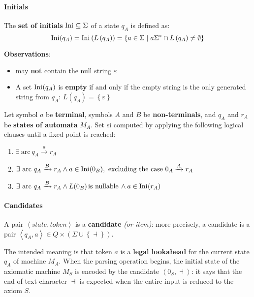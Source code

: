 \documentclass[english]{article}
\begin{document}
\paragraph{Initials}

The \textbf{set of initials} \(\text{Ini}\hspace{0.1ex} \subseteq \Sigma\) of a state \(q_A\) is defined as:
\[ \text{Ini}\hspace{0.1ex}(q_A) = \text{Ini}\hspace{0.1ex}\left( L\left( q_A \right) \right) = \left\{ a \in \Sigma \mid a \Sigma^\ast \cap L\left( q_A \right) \neq \emptyset \right\} \]

\bigskip
\textbf{Observations}:

\begin{itemize}
  \item \Ini may \textbf{not} contain the null string \(\varepsilon\)
  \item A set \(\text{Ini}\hspace{0.1ex}(q_A)\) is \textbf{empty} if and only if the empty string is the only generated string from \(q_A\): \(L\left( q_A \right) = \left\{ \varepsilon \right\}\)
\end{itemize}

\bigskip
Let symbol \(a\) be \textbf{terminal}, symbols \(A\) and \(B\) be \textbf{non-terminals}, and \(q_A\) and \(r_A\) be \textbf{states of automata} \(M_A\).
Set \Ini si computed by applying the following logical clauses until a fixed point is reached:

\begin{enumerate}
  \item \(\exists \ \text{arc} \ q_A \xrightarrow{a} r_A\)
  \item \(\exists \ \text{arc} \ q_A \xrightarrow{B} r_A \land a \in \Ini(0_B), \ \text{excluding the case} \ 0_A \xrightarrow{A} r_A\)
  \item \(\exists \ \text{arc} \ q_A \xrightarrow{B} r_A \land L(0_B) \, \text{is nullable} \, \land a \in \text{Ini}\hspace{0.1ex}(r_A)\)
\end{enumerate}

\paragraph{Candidates}
\label{par:candidates}

A pair \(\left\langle \textit{state}, \textit{token} \right\rangle\) is a \textbf{candidate} \textit{(or item)}:
more precisely, a candidate is a pair \(\left\langle q_A, a \right\rangle \in Q \times \left( \Sigma \cup \left\{ \dashv \right\} \right)\).

The intended meaning is that token \(a\) is a \textbf{legal lookahead} for the current state \(q_A\) of machine \(M_A\).
When the parsing operation begins, the initial state of the axiomatic machine \(M_S\) is encoded by the candidate \(\left\langle 0_S, \dashv \right\rangle\):
it says that the end of text character \(\dashv\) is expected when the entire input is reduced to the axiom \(S\).
\end{document}
